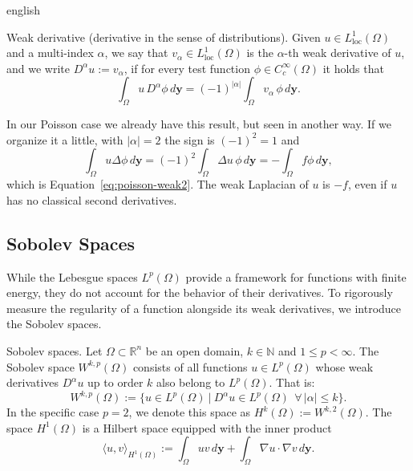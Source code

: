 \documentclass[11pt,letterpaper,twoside,openright]{book} %
\newcommand{\abs}[1]{\left\lvert #1 \right\rvert}
\begin{document}
\begin{hyphenrules}{english}
\begin{definicion}{Weak derivative (derivative in the sense of distributions).}\label{def:weak-derivative}
Given $u\in L^1_{\mathrm{loc}}(\Omega)$ and a multi-index $\alpha$, we say that
$v_\alpha\in L^1_{\mathrm{loc}}(\Omega)$ is the $\alpha$-th weak derivative of $u$, and we write
$D^\alpha u:=v_\alpha$, if for every test function $\phi\in C_c^\infty(\Omega)$ it holds that
\cite{reyna_sobolev}
\begin{equation}
  \int_\Omega u\,D^\alpha\phi\,d\mathbf{y}=(-1)^{\abs{\alpha}}\int_\Omega v_\alpha\,\phi\,d\mathbf{y}.
  \label{eq:weak-derivative}
\end{equation}
\end{definicion}

In our Poisson case we already have this result, but seen in another way. If we organize it a little,
with $\abs{\alpha}=2$ the sign is $(-1)^2=1$ and
\begin{equation}
  \int_\Omega u\Delta\phi\,d\mathbf{y}=(-1)^2\int_\Omega\Delta u\,\phi\,d\mathbf{y}=-\int_\Omega f\phi\,d\mathbf{y},
  \label{eq:weak-poisson-again}
\end{equation}
which is Equation~\eqref{eq:poisson-weak2}. The weak Laplacian of $u$ is $-f$, even if $u$ has no classical second
derivatives.

\subsection{Sobolev Spaces}\label{subsec:sobolev}

While the Lebesgue spaces $L^p(\Omega)$ provide a framework for functions with finite energy, they do
not account for the behavior of their derivatives. To rigorously measure the regularity of a function
alongside its weak derivatives, we introduce the Sobolev spaces.

\begin{definicion}{Sobolev spaces.}\label{def:sobolev}
Let $\Omega\subset\mathbb{R}^n$ be an open domain, $k\in\mathbb{N}$ and $1\le p<\infty$. The Sobolev space
$W^{k,p}(\Omega)$ consists of all functions $u\in L^p(\Omega)$ whose weak derivatives $D^\alpha u$ up to
order $k$ also belong to $L^p(\Omega)$. That is:
\begin{equation}
  W^{k,p}(\Omega):=\big\{u\in L^p(\Omega)\ \big|\ D^\alpha u\in L^p(\Omega)\ \ \forall\,\abs{\alpha}\le k\big\}.
  \label{eq:sobolev}
\end{equation}
In the specific case $p=2$, we denote this space as $H^k(\Omega):=W^{k,2}(\Omega)$. The space
$H^1(\Omega)$ is a Hilbert space equipped with the inner product
\begin{equation}
  \langle u,v\rangle_{H^1(\Omega)}:=\int_\Omega uv\,d\mathbf{y}+\int_\Omega\nabla u\cdot\nabla v\,d\mathbf{y}.
  \label{eq:h1-inner}
\end{equation}
\end{definicion}


\end{hyphenrules}
\end{document}
